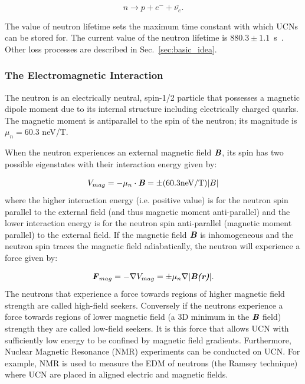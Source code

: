 \begin{equation}
n \rightarrow p + e^- + \overline{\nu_e}.
\end{equation}

The value of neutron lifetime sets the maximum time constant with
which UCNs can be stored for.  The current value of the neutron
lifetime is $880.3 \pm 1.1$~s~\cite{PDG2016}. Other loss processes
are described in Sec.~\ref{sec:basic_idea}.

\subsubsection{The Electromagnetic Interaction}

The neutron is an electrically neutral, spin-1/2 particle that
possesses a magnetic dipole moment due to its internal structure
including electrically charged quarks. The magnetic moment is
antiparallel to the spin of the neutron; its magnitude is $\mu_n=60.3$
neV/T.


When the neutron experiences an external magnetic field
$\textbf{\textit{B}}$, its spin has two possible eigenstates with
their interaction energy given by:

\begin{equation}
\label{eqn:magn}
V_{mag}= - \mu_n \cdot \textbf{\textit{B}} = \pm (60.3\textrm{neV/T}) \vert B \vert
\end{equation}
where the higher interaction energy (i.e. positive value) is for the
neutron spin parallel to the external field (and thus magnetic moment
anti-parallel) and the lower interaction energy is for the neutron
spin anti-parallel (magnetic moment parallel) to the external field.
If the magnetic field $\textbf{\textit{B}}$ is inhomogeneous and the
neutron spin traces the magnetic field adiabatically, the neutron will
experience a force given by:

\begin{equation}
\label{eqn:emforce}
\textbf{\textit{F}}_{mag}= - \mathbf{\mathit{\nabla}} V_{mag}=\pm
\mu_n \mathbf{\mathit{\nabla}} \vert \textbf{\textit{B(r)}} \vert.
\end{equation}
The neutrons that experience a force towards regions of higher
magnetic field strength are called high-field seekers. Conversely if
the neutrons experience a force towards regions of lower magnetic
field (a 3D minimum in the $\textbf{\textit{B}}$ field) strength they
are called low-field seekers. It is this force that allows UCN with
sufficiently low energy to be confined by magnetic field gradients.
Furthermore, Nuclear Magnetic Resonance (NMR) experiments can be
conducted on UCN. For example, NMR is used to measure the EDM of
neutrons (the Ramsey technique) where UCN are placed in aligned
electric and magnetic fields.

